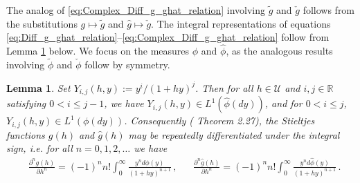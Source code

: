 \documentclass[english,12pt,jmp,graphicx]{revtex4-1}
\newtheorem{lemma}{Lemma}[section]
\newcommand{\ph}{\hat{\phi}}
\begin{document}
%
The analog of \eqref{eq:Complex_Diff_g_ghat_relation}
involving $\tilde{g}$ and $\check{g}$ follows from the
substitutions $g\mapsto\tilde{g}$ and $\hat{g}\mapsto\check{g}$. 
The integral representations of equations
\eqref{eq:Diff_g_ghat_relation}--\eqref{eq:Complex_Diff_g_ghat_relation}
follow from Lemma \ref{lem:L1_Yij} below. We focus on the
measures $\phi$ and $\ph$, as the analogous results involving $\tilde{\phi}$
and $\check{\phi}$ follow by symmetry.

\begin{lemma}\label{lem:L1_Yij}  
  Set $Y_{i,j}(h,y):=y^i/(1+hy)^j$. Then for all $h\in\mathcal{U}$ and
  $i,j\in\mathbb{R}$ satisfying $0<i\leq j-1$, we have
  $Y_{i,j}(h,y)\in L^1(\ph(dy))$, and for $0<i\leq j$,
  $Y_{i,j}(h,y)\in L^1(\phi(dy))$. Consequently (\cite{Folland:95} Theorem
  2.27), the Stieltjes functions $g(h)$ and $\hat{g}(h)$ may be
  repeatedly differentiated under the integral sign, i.e. for all
  $n=0,1,2,\ldots$ we have 
  \begin{align}\label{eq:Integral_rep_g_ghat}
    &\frac{\partial^ng(h)}{\partial h^n}%
                     =(-1)^nn!\int_0^\infty\frac{y^nd\phi(y)}{(1+hy)^{n+1}}\,,
         &&
    \frac{\partial^n\hat{g}(h)}{\partial h^n}%
                     =(-1)^nn!\int_0^\infty\frac{y^nd\ph(y)}{(1+hy)^{n+1}}\,.
  \end{align}
\end{lemma}
%
\end{document}
